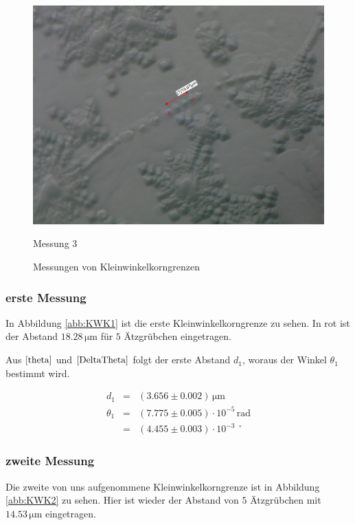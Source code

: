 \documentclass[12pt,a4paper]{scrartcl}
\numberwithin{equation}{section} %
\begin{document}
\begin{figure}[h]
\begin{minipage}[t]{.31\linewidth}
		\includegraphics[width=\textwidth]{../media/B2.8/KWK3_tempered.pdf}
		\caption{Messung 3}
		\label{abb:KWK3}
	\end{minipage}
	\caption*{Messungen von Kleinwinkelkorngrenzen}
\end{figure}

\hypertarget{erste-messung}{%
\subsubsection{erste Messung}\label{erste-messung}}

In Abbildung \ref{abb:KWK1} ist die erste Kleinwinkelkorngrenze zu sehen. In rot ist der Abstand $18.28 \mathrm{\, \mu m}$ für $5$ Ätzgrübchen eingetragen.

Aus $\eqref{theta}$ und $\eqref{DeltaTheta}$ folgt der erste Abstand $d_1$, woraus der Winkel $\theta_1$ bestimmt wird.

\begin{eqnarray}
    d_1 &=& (3.656 \pm 0.002) \mathrm{\, \mu m} \\
    \theta_1 &=& (7.775 \pm 0.005) \cdot 10^{-5} \mathrm{\, rad} \\
        &=& (4.455 \pm 0.003) \cdot 10^{-3\ \ \circ}
\end{eqnarray}

\hypertarget{zweite-messung}{%
\subsubsection{zweite Messung}\label{zweite-messung}}

Die zweite von uns aufgenommene Kleinwinkelkorngrenze ist in Abbildung \ref{abb:KWK2} zu sehen. Hier ist wieder der Abstand von $5$ Ätzgrübchen mit $14.53 \mathrm{\, \mu m}$ eingetragen.
\end{document}
